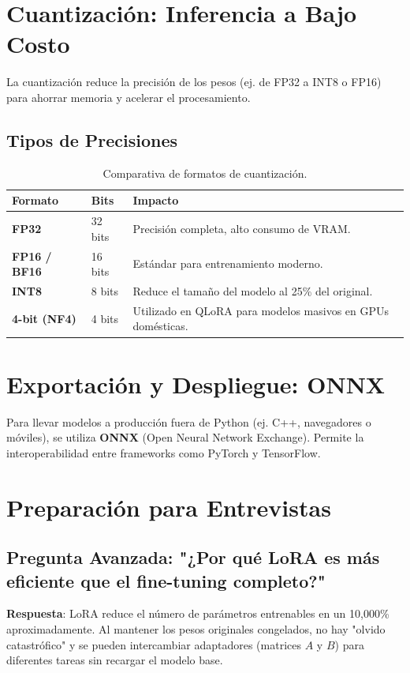\documentclass[12pt,a4paper,openany,oneside]{book}
\begin{document}
\section{Cuantización: Inferencia a Bajo Costo}

La cuantización reduce la precisión de los pesos (ej. de FP32 a INT8 o FP16) para ahorrar memoria y acelerar el procesamiento.

\subsection{Tipos de Precisiones}
\begin{table}[h]
\centering
\begin{tabular}{l l l}
\toprule
\textbf{Formato} & \textbf{Bits} & \textbf{Impacto} \\ \midrule
\textbf{FP32} & 32 bits & Precisión completa, alto consumo de VRAM. \\
\textbf{FP16 / BF16} & 16 bits & Estándar para entrenamiento moderno. \\
\textbf{INT8} & 8 bits & Reduce el tamaño del modelo al 25\% del original. \\
\textbf{4-bit (NF4)} & 4 bits & Utilizado en QLoRA para modelos masivos en GPUs domésticas. \\ \bottomrule
\end{tabular}
\caption{Comparativa de formatos de cuantización.}
\end{table}

\section{Exportación y Despliegue: ONNX}

Para llevar modelos a producción fuera de Python (ej. C++, navegadores o móviles), se utiliza \textbf{ONNX} (Open Neural Network Exchange). Permite la interoperabilidad entre frameworks como PyTorch y TensorFlow.

\section{Preparación para Entrevistas}

\subsection{Pregunta Avanzada: "¿Por qué LoRA es más eficiente que el fine-tuning completo?"}
\textbf{Respuesta}: LoRA reduce el número de parámetros entrenables en un 10,000\% aproximadamente. Al mantener los pesos originales congelados, no hay "olvido catastrófico" y se pueden intercambiar adaptadores (matrices $A$ y $B$) para diferentes tareas sin recargar el modelo base.
\end{document}
